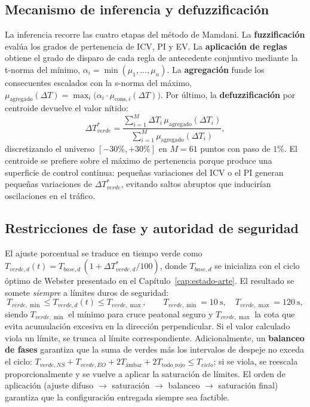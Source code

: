 \subsection{Mecanismo de inferencia y defuzzificación}\label{subsec:fuzzy-inferencia}

La inferencia recorre las cuatro etapas del método de Mamdani. La \textbf{fuzzificación}
evalúa los grados de pertenencia de ICV, PI y EV. La \textbf{aplicación de reglas} obtiene el
grado de disparo de cada regla de antecedente conjuntivo mediante la t-norma del mínimo,
$\alpha_i=\min(\mu_{1},\ldots,\mu_{n})$. La \textbf{agregación} funde los consecuentes
escalados con la s-norma del máximo,
$\mu_{\text{agregado}}(\Delta T)=\max_i\big(\alpha_i\cdot\mu_{\text{cons},i}(\Delta T)\big)$.
Por último, la \textbf{defuzzificación} por centroide devuelve el valor nítido:
\[
\Delta T_{verde}^{*}=
\frac{\sum_{i=1}^{M}\Delta T_i\,\mu_{\text{agregado}}(\Delta T_i)}
     {\sum_{i=1}^{M}\mu_{\text{agregado}}(\Delta T_i)},
\]
discretizando el universo $[-30\%,+30\%]$ en $M=61$ puntos con paso de $1\%$. El centroide se
prefiere sobre el máximo de pertenencia porque produce una superficie de control continua:
pequeñas variaciones del ICV o el PI generan pequeñas variaciones de $\Delta T_{verde}^{*}$,
evitando saltos abruptos que inducirían oscilaciones en el tráfico.

\subsection{Restricciones de fase y autoridad de seguridad}\label{subsec:fuzzy-seguridad}

El ajuste porcentual se traduce en tiempo verde como
$T_{verde,d}(t)=T_{base,d}\,(1+\Delta T_{verde,d}^{*}/100)$, donde $T_{base,d}$ se inicializa
con el ciclo óptimo de Webster presentado en el Capítulo~\ref{cap:estado-arte}. El resultado se
somete \emph{siempre} a límites duros de seguridad:
\[
T_{verde,\min}\le T_{verde,d}(t)\le T_{verde,\max},
\qquad T_{verde,\min}=10\ \text{s},\quad T_{verde,\max}=120\ \text{s},
\]
siendo $T_{verde,\min}$ el mínimo para cruce peatonal seguro y $T_{verde,\max}$ la cota que
evita acumulación excesiva en la dirección perpendicular. Si el valor calculado viola un
límite, se trunca al límite correspondiente. Adicionalmente, un \textbf{balanceo de fases}
garantiza que la suma de verdes más los intervalos de despeje no exceda el ciclo:
$T_{verde,NS}+T_{verde,EO}+2T_{\text{ámbar}}+2T_{\text{todo\_rojo}}\le T_{ciclo}$; si se viola,
se reescala proporcionalmente y se vuelve a aplicar la saturación de límites. El orden de
aplicación (ajuste difuso $\rightarrow$ saturación $\rightarrow$ balanceo $\rightarrow$
saturación final) garantiza que la configuración entregada siempre sea factible.

